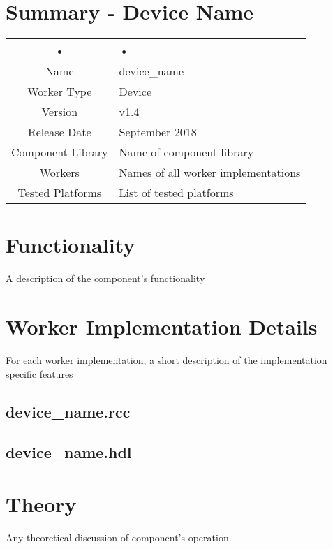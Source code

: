 \documentclass{article}
\author{} %
\date{Version \docVersion} %
\title{\docTitle}
\def\docVersion{1.4}
\def\comp{device\_name}
\def\Comp{Device Name}
\begin{document}
\section*{Summary - \Comp}
\begin{tabular}{|c|M{13.5cm}|}
	\hline
	•               & •                                 \\
	\hline
	Name              & \comp                               \\
	\hline
	Worker Type       & Device                              \\
	\hline
	Version           & v\docVersion                               \\
	\hline
	Release Date      & September 2018                        \\
	\hline
	Component Library & Name of component library           \\
	\hline
	Workers           & Names of all worker implementations \\
	\hline
	Tested Platforms  & List of tested platforms            \\
	\hline
\end{tabular}

\section*{Functionality}
\begin{flushleft}
	A description of the component's functionality
\end{flushleft}

\section*{Worker Implementation Details}
\begin{flushleft}
	For each worker implementation, a short description of the implementation specific features
	\subsection*{\comp.rcc}
	\subsection*{\comp.hdl}
\end{flushleft}

\section*{Theory}
\begin{flushleft}
	Any theoretical discussion of component's operation.
\end{flushleft}
\end{document}
